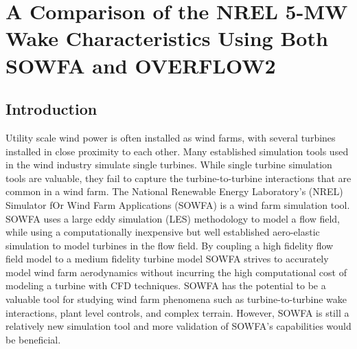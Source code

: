 
\chapter{A Comparison of the NREL 5-MW Wake Characteristics Using Both SOWFA and OVERFLOW2} %

\label{Chapter5} %



\section{Introduction}\label{section5-1}
Utility scale wind power is often installed as wind farms, with several turbines installed in close proximity to each other. Many established simulation tools used in the wind industry simulate single turbines.\cite{jonkman2005,chow2012,chow2013,platt2012} While single turbine simulation tools are valuable, they fail to capture the turbine-to-turbine interactions that are common in a wind farm. The National Renewable Energy Laboratory's (NREL) Simulator fOr Wind Farm Applications (SOWFA) is a wind farm simulation tool.\cite{churchfield2012} SOWFA uses a large eddy simulation (LES) methodology to model a flow field, while using a computationally inexpensive but well established aero-elastic simulation to model turbines in the flow field. By coupling a high fidelity flow field model to a medium fidelity turbine model SOWFA strives to accurately model wind farm aerodynamics without incurring the high computational cost of modeling a turbine with CFD techniques. SOWFA has the potential to be a valuable tool for studying wind farm phenomena such as turbine-to-turbine wake interactions\cite{lee2012}, plant level controls\cite{fleming2013}, and complex terrain.\cite{churchfield2013} However, SOWFA is still a relatively new simulation tool and more validation of SOWFA's capabilities would be beneficial. 

